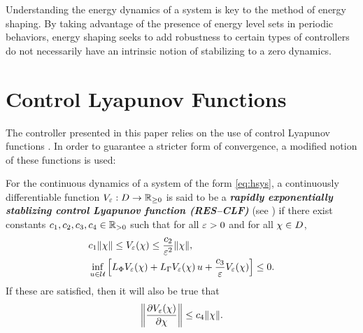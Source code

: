 Understanding the energy dynamics of a system is key to the method of energy shaping.
%
By taking advantage of the presence of energy level sets in periodic behaviors, energy shaping seeks to add robustness to certain types of controllers do not necessarily have an intrinsic notion of stabilizing to a zero dynamics.
%


\section{Control Lyapunov Functions}

The controller presented in this paper relies on the use of control Lyapunov functions \cite{Artstein1983,Freeman1996}.
%
In order to guarantee a stricter form of convergence, a modified notion of these functions is used:\vgap

\begin{definition}
  \label{def:res-clf}
  For the continuous dynamics of a system of the form \eqref{eq:hsys}, a continuously differentiable function $V_{\varepsilon} : D \to \mathbb{R}_{\geq 0}$ is said to be a {\bf \em rapidly exponentially stablizing control Lyapunov function (RES--CLF)} (see \cite{Ames2014}) if there exist constants $c_{1}, c_{2}, c_{3}, c_{4} \in \mathbb{R}_{> 0}$ such that for all $\varepsilon > 0$ and for all $\chi \in D$,
  \begin{eqnarray}
    &c_{1} \|\chi\| \leq V_{\varepsilon}(\chi) \leq \frac{c_{2}}{\varepsilon^{2}} \|\chi\|,\\
    \nonumber
    &\inf_{u \in \mathcal{U}} \left[ L_{\Phi} V_{\varepsilon}(\chi) + L_{\Gamma} V_{\varepsilon}(\chi) \, u + \frac{c_{3}}{\varepsilon} V_{\varepsilon}(\chi) \right] \leq 0.
  \end{eqnarray}
  If these are satisfied, then it will also be true that
  \begin{align}
    \label{eq:dVedx-bounds}
    \left\| \frac{\partial{V_{\varepsilon}(\chi)}}{\partial{\chi}} \right\| \leq c_{4} \|\chi\|.
  \end{align}
\end{definition}
\


